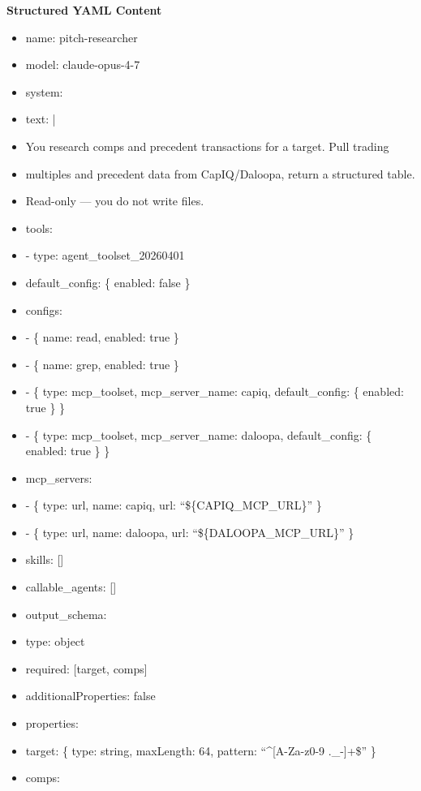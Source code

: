 \documentclass[11pt]{article}
\begin{document}
\textbf{Structured YAML Content}
\begin{itemize}[leftmargin=*,itemsep=2pt,topsep=2pt]
\item {} name: pitch-researcher
\item {} model: claude-opus-4-7
\item {} system:
\item {} text: |
\item {} You research comps and precedent transactions for a target. Pull trading
\item {} multiples and precedent data from CapIQ/Daloopa, return a structured table.
\item {} Read-only — you do not write files.
\item {} tools:
\item {} - type: agent\_\allowbreak{}toolset\_\allowbreak{}20260401
\item {} default\_\allowbreak{}config: \{ enabled: false \}
\item {} configs:
\item {} - \{ name: read, enabled: true \}
\item {} - \{ name: grep, enabled: true \}
\item {} - \{ type: mcp\_\allowbreak{}toolset, mcp\_\allowbreak{}server\_\allowbreak{}name: capiq, default\_\allowbreak{}config: \{ enabled: true \} \}
\item {} - \{ type: mcp\_\allowbreak{}toolset, mcp\_\allowbreak{}server\_\allowbreak{}name: daloopa, default\_\allowbreak{}config: \{ enabled: true \} \}
\item {} mcp\_\allowbreak{}servers:
\item {} - \{ type: url, name: capiq, url: ``\$\{CAPIQ\_\allowbreak{}MCP\_\allowbreak{}URL\}'' \}
\item {} - \{ type: url, name: daloopa, url: ``\$\{DALOOPA\_\allowbreak{}MCP\_\allowbreak{}URL\}'' \}
\item {} skills: []
\item {} callable\_\allowbreak{}agents: []
\item {} output\_\allowbreak{}schema:
\item {} type: object
\item {} required: [target, comps]
\item {} additionalProperties: false
\item {} properties:
\item {} target: \{ type: string, maxLength: 64, pattern: ``\textasciicircum{}[A-Za-z0-9 .\_\allowbreak{}-]+\$'' \}
\item {} comps:

\end{itemize}
\end{document}
